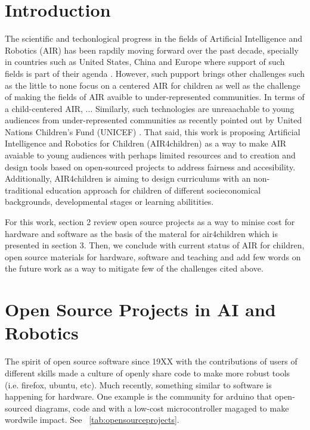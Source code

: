 \documentclass[sigconf]{acmart}
\begin{document}
\maketitle

\section{Introduction} 
The scientific and techonlogical progress in the fields of Artificial Intelligence and Robotics (AIR) has been rapdily moving forward over the past decade, specially in countries such as United States, China and Europe where support of such fields is part of their agenda \cite{Savage2020}. 
However, such pupport brings other challenges such as the little to none focus on a centered AIR for children as well as the challenge of making the fields of AIR avaible to under-represented communities.
In terms of a child-centered AIR, ...
Similarly, such technologies are unreaachable to young audiences from under-represented communities as recently pointed out by United Nations Children's Fund (UNICEF) \cite{UNICEF2020}.
That said, this work is proposing Artificial Intelligence and Robotics for Children (AIR4children) as a way to make AIR avaiable to young audiences with perhaps limited resources and to creation and design tools based on open-sourced projects to address fairness and accesibility. 
Additionally, AIR4children is aiming to design curriculums with an non-traditional education approach for children of different socieconomical backgrounds, developmental stages or learning abilitities. 

For this work, section 2 review open source projects as a way to minise cost for hardware and software as the basis of the materal for air4children which is presented in section 3. 
Then, we conclude with current status of AIR for children, open source materials for hardware, software and teaching and add few words on the future work as a way to mitigate few of the challenges cited above. 

\section{Open Source Projects in AI and Robotics}
The spirit of open source software since 19XX with the contributions 
of users of different skills made a culture of openly share code to make
more robust tools (i.e. firefox, ubuntu, etc). Much recently, something 
similar to software is happening for hardware. One example is the community 
for arduino that open-sourced diagrams, code and with a low-cost microcontroller
magaged to make wordwile impact. See ~\ref{tab:opensourceprojects}.
\end{document}
